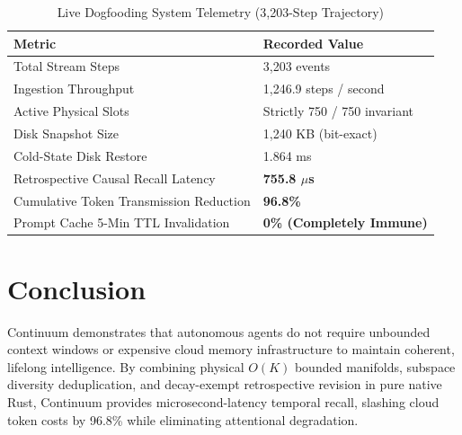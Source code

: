 \documentclass[10pt,journal,compsoc]{IEEEtran}
\begin{document}
\begin{table}[h]
\caption{Live Dogfooding System Telemetry (3,203-Step Trajectory)}
\centering
\begin{tabular}{ll}
\toprule
Metric & Recorded Value \\
\midrule
Total Stream Steps & 3,203 events \\
Ingestion Throughput & 1,246.9 steps / second \\
Active Physical Slots & Strictly 750 / 750 invariant \\
Disk Snapshot Size & 1,240 KB (bit-exact) \\
Cold-State Disk Restore & 1.864 ms \\
Retrospective Causal Recall Latency & \textbf{755.8 $\mu$s} \\
Cumulative Token Transmission Reduction & \textbf{96.8\%} \\
Prompt Cache 5-Min TTL Invalidation & \textbf{0\% (Completely Immune)} \\
\bottomrule
\end{tabular}
\end{table}

\section{Conclusion}
Continuum demonstrates that autonomous agents do not require unbounded context windows or expensive cloud memory infrastructure to maintain coherent, lifelong intelligence. By combining physical $O(K)$ bounded manifolds, subspace diversity deduplication, and decay-exempt retrospective revision in pure native Rust, Continuum provides microsecond-latency temporal recall, slashing cloud token costs by 96.8\% while eliminating attentional degradation.



\end{document}
